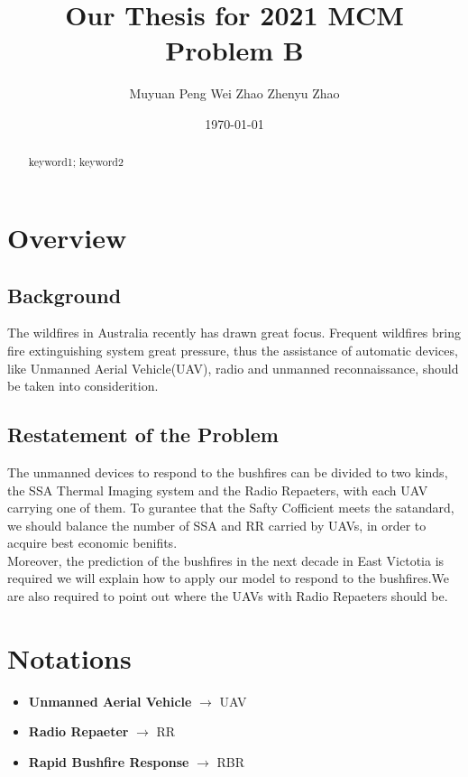 \documentclass{mcmthesis}
\title{Our Thesis for 2021 MCM Problem B}
\author{Muyuan Peng \quad Wei Zhao \quad Zhenyu Zhao}
\date{\today}
\begin{document}
\begin{abstract}
 

\begin{keywords}
keyword1; keyword2
\end{keywords}
\end{abstract}
\maketitle
\tableofcontents
\newpage
\section{Overview}
\subsection{Background}


 The wildfires in Australia recently has drawn great focus. Frequent wildfires bring fire extinguishing system great pressure, thus the assistance
of automatic devices, like Unmanned Aerial Vehicle(UAV), 
radio and unmanned reconnaissance, should be taken into considerition. 
\subsection{Restatement of the Problem}

The unmanned devices to respond to the bushfires can be divided to two kinds,
the SSA Thermal Imaging system and the Radio Repaeters, with each UAV carrying
one of them. To gurantee that the Safty Cofficient meets the satandard, we should
balance the number of SSA and RR carried by UAVs, in order to acquire best economic benifits.\\
Moreover, the prediction of the bushfires in the next decade in East Victotia is required
we will explain how to apply our model to respond to the bushfires.We are also required 
to point out where the UAVs with Radio Repaeters should be.


\section{Notations}
\begin{itemize}
  \item \textbf{Unmanned Aerial Vehicle} $\rightarrow$ UAV
  \item \textbf{Radio Repaeter} $\rightarrow$ RR
  \item \textbf{Rapid Bushfire Response} $\rightarrow$ RBR
\end{itemize}
\end{document}

